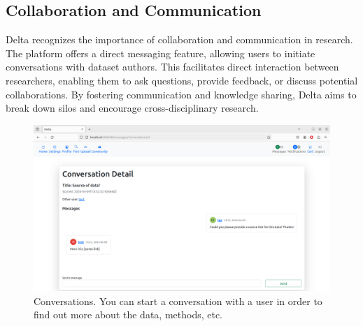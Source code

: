 \documentclass[conference]{IEEEtran}
\begin{document}
\subsection{Collaboration and Communication}
Delta recognizes the importance of collaboration and communication in research. The platform offers a direct messaging feature, allowing users to initiate conversations with dataset authors. This facilitates direct interaction between researchers, enabling them to ask questions, provide feedback, or discuss potential collaborations. By fostering communication and knowledge sharing, Delta aims to break down silos and encourage cross-disciplinary research.
\begin{figure}[h]
  \centering
  \includegraphics[width=\columnwidth]{figures/convo.png}
  \caption{Conversations. You can start a conversation with a user in order to find out more about the data, methods, etc.}
  \label{fig:delta-convo}
\end{figure}
\end{document}
